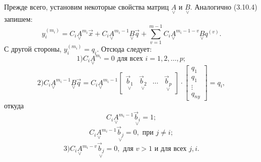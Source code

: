 Прежде всего, установим некоторые свойства матриц $\underset{\lor}{A}$ и $\underset{\lor}{B}$. Аналогично (3.10.4) запишем:
\begin{equation*}
	y_i^{(m_i)}=C_i\underset{\lor}{A}^{m_i}\vec{x}+C_i\underset{\lor}{A}^{m_i-1}\underset{\lor}{B}\vec{q}+\sum_{v=1}^{m-1}C_i\underset{\lor}{A}^{m_i-1-v}\underset{\lor}{B}q^{(v)}.
\end{equation*}
С другой стороны, $y_i^{(m_i)}=q_i$. Отсюда следует:
\begin{equation}
	1) C_i\underset{\lor}{A}^{m_i}=0\text{ для всех }i=1,2,\dots,p;
\end{equation}
\begin{equation}
	2) C_i\underset{\lor}{A}^{m_i-1}\underset{\lor}{B}\vec{q}=C_i\underset{\lor}{A}^{m_i-1}
	\begin{bmatrix}
		 \underset{\lor}{\vec{b}_1} & \underset{\lor}{\vec{b}_2} & \dots & \underset{\lor}{\vec{b}_p}
	\end{bmatrix}\cdot
	\begin{bmatrix}
		 q_1\\q_1\\\vdots\\q_{ny}
	\end{bmatrix}=q_i,
\end{equation}
откуда
\begin{equation}
	C_i\underset{\lor}{A}^{m_i-1}\underset{\lor}{\vec{b}_i}=1;
\end{equation}
\begin{equation}
	C_i\underset{\lor}{A}^{m_i-1}\underset{\lor}{\vec{b}_j}=0,\text{ при } j\neq i;
\end{equation}
\begin{equation}
	3)C_i\underset{\lor}{A}^{m_i-v}\underset{\lor}{\vec{b}_j}=0,\text{ для } v>1 \text{ и для всех } j,i.
\end{equation}

